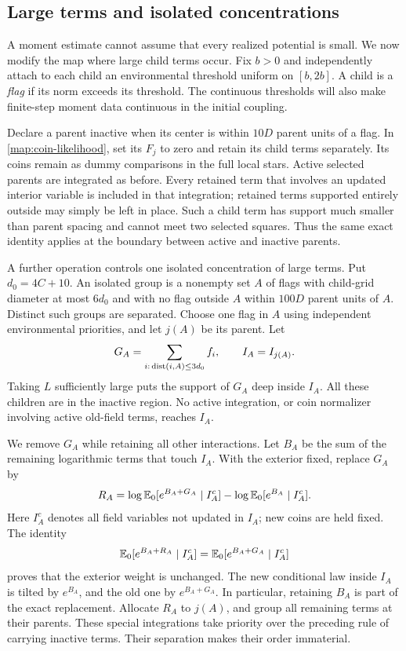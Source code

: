 \subsection{Large terms and isolated concentrations}

A moment estimate cannot assume that every realized potential is small.
We now modify the map where large child terms occur.  Fix $b>0$ and
independently attach to each child an environmental threshold uniform
on $[b,2b]$.  A child is a \emph{flag} if its norm exceeds its threshold.
The continuous thresholds will also make finite-step moment data
continuous in the initial coupling.

Declare a parent inactive when its center is within $10D$ parent units
of a flag.  In \eqref{map:coin-likelihood}, set its $F_j$ to zero and
retain its child terms separately.  Its coins remain as dummy
comparisons in the full local stars.  Active selected parents are
integrated as before.  Every retained term that involves an updated
interior variable is included in that integration; retained terms
supported entirely outside may simply be left in place.  Such a child
term has support much smaller than parent spacing and cannot meet two
selected squares.  Thus the same exact identity applies at the
boundary between active and inactive parents.

A further operation controls one isolated concentration of large terms.
Put $d_0=4C+10$.  An isolated group is a nonempty set $A$ of flags with
child-grid diameter at most $6d_0$ and with no flag outside $A$ within
$100D$ parent units of $A$.  Distinct such groups are separated.  Choose
one flag in $A$ using independent environmental priorities, and let
$j(A)$ be its parent.  Let
\[
 G_A=\sum_{i:\,\operatorname{dist}(i,A)\le3d_0}f_i,
 \qquad I_A=I_{j(A)}.
\]
Taking $L$ sufficiently large puts the support of $G_A$ deep inside
$I_A$.  All these children are in the inactive region.  No active
integration, or coin normalizer involving active old-field terms,
reaches $I_A$.

We remove $G_A$ while retaining all other interactions.  Let $B_A$ be
the sum of the remaining logarithmic terms that touch $I_A$.  With the
exterior fixed, replace $G_A$ by
\begin{equation}\label{map:isolated-ratio}
 R_A=\log\mathbb E_0[e^{B_A+G_A}\mid I_A^c]
       -\log\mathbb E_0[e^{B_A}\mid I_A^c].
\end{equation}
Here $I_A^c$ denotes all field variables not updated in $I_A$; new coins
are held fixed.  The identity
\begin{equation}\label{map:isolated-exactness}
 \mathbb E_0[e^{B_A+R_A}\mid I_A^c]
 =\mathbb E_0[e^{B_A+G_A}\mid I_A^c]
\end{equation}
proves that the exterior weight is unchanged.  The new conditional law
inside $I_A$ is tilted by $e^{B_A}$, and the old one by $e^{B_A+G_A}$.
In particular, retaining $B_A$ is part of the exact replacement.
Allocate $R_A$ to $j(A)$, and group all remaining terms at their parents.
These special integrations take priority over the preceding rule of
carrying inactive terms.  Their separation makes their order immaterial.


